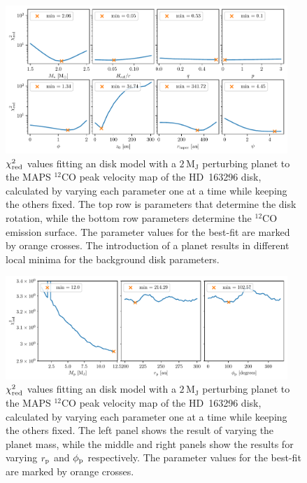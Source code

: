 \begin{figure}
    \centering
    \includegraphics[width = 0.95\textwidth]{figures/chi_sq_background_planet_hd163.pdf}
    \caption{$\chi_{\rm red}^2$ values fitting an disk model with a $2 \, \mathrm{M_J}$ perturbing planet to the MAPS $^{12}$CO peak velocity map of the HD~163296 disk, calculated by varying each parameter one at a time while keeping the others fixed. The top row is parameters that determine the disk rotation, while the bottom row parameters determine the $^{12}$CO emission surface. The parameter values for the best-fit are marked by orange crosses. The introduction of a planet results in different local minima for the background disk parameters.}
    \label{fig:grid_chisq_planet_bg}
\end{figure}

\begin{figure}
    \centering
    \includegraphics[width = 0.95\textwidth]{figures/chi_sq_planet_hd163.pdf}
    \caption{$\chi_{\rm red}^2$ values fitting an disk model with a $2 \, \mathrm{M_J}$ perturbing planet to the MAPS $^{12}$CO peak velocity map of the HD~163296 disk, calculated by varying each parameter one at a time while keeping the others fixed. The left panel shows the result of varying the planet mass, while the middle and right panels show the results for varying $r_{\rm p}$ and $\phi_{\rm p}$ respectively. The parameter values for the best-fit are marked by orange crosses.}
    \label{fig:grid_chisq_planet}
\end{figure}


